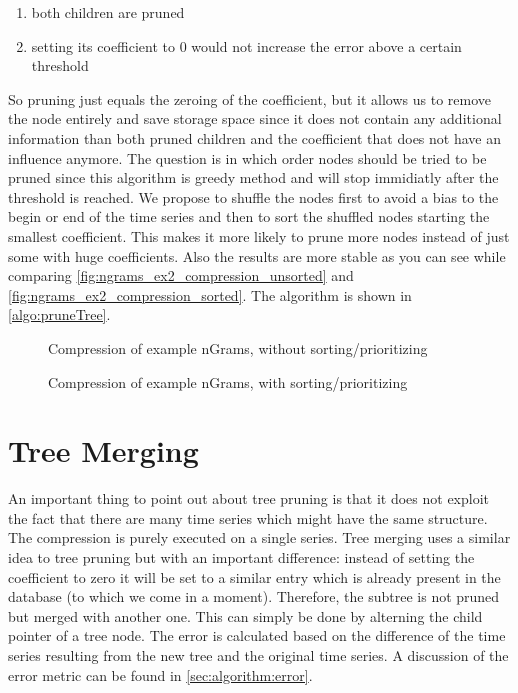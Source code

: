 \begin{enumerate}
    \item both children are pruned
    \item setting its coefficient to $0$ would not increase the error above a certain threshold
\end{enumerate}

So pruning just equals the zeroing of the coefficient, but it allows us to remove the node entirely and save storage space since it does not contain any additional information than both pruned children and the coefficient that does not have an influence anymore. The question is in which order nodes should be tried to be pruned since this algorithm is greedy method and will stop immidiatly after the threshold is reached. We propose to shuffle the nodes first to avoid a bias to the begin or end of the time series and then to sort the shuffled nodes starting the smallest coefficient. This makes it more likely to prune more nodes instead of just some with huge coefficients. Also the results are more stable as you can see while comparing \autoref{fig:ngrams_ex2_compression_unsorted} and \autoref{fig:ngrams_ex2_compression_sorted}. The algorithm is shown in \autoref{algo:pruneTree}.

\begin{figure}
    \centering
    
    \caption{Compression of example nGrams, without sorting/prioritizing}
    \label{fig:ngrams_ex2_compression_unsorted}
\end{figure}

\begin{figure}
    \centering
    
    \caption{Compression of example nGrams, with sorting/prioritizing}
    \label{fig:ngrams_ex2_compression_sorted}
\end{figure}



\section{Tree Merging}
\label{sec:algorithm:merge}

An important thing to point out about tree pruning is that it does not exploit the fact that there are many time series which might have the same structure. The compression is purely executed on a single series. Tree merging uses a similar idea to tree pruning but with an important difference: instead of setting the coefficient to zero it will be set to a similar entry which is already present in the database (to which we come in a moment). Therefore, the subtree is not pruned but merged with another one. This can simply be done by alterning the child pointer of a tree node. The error is calculated based on the difference of the time series resulting from the new tree and the original time series. A discussion of the error metric can be found in \autoref{sec:algorithm:error}.

